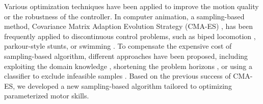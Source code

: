 Various optimization techniques have been applied to improve the
motion quality or the robustness of the controller. In computer
animation, a sampling-based method, Covariance Matrix Adaption
Evolution Strategy (CMA-ES) \cite{Hansen:2003:CMA}, has been
frequently applied to discontinuous control problems, such as biped
locomotion \cite{Wang:2010:OWC,Wang:2012:OLC},
parkour-style stunts\cite{Liu:2012:TRC,Ha:2014:ITD}, or swimming
\cite{Tan:2011:ASC}.  To compensate the expensive cost of
sampling-based algorithm, different approaches have been proposed,
including exploiting the domain knowledge
\cite{Wang:2010:OWC,Wang:2012:OLC}, shortening the
problem horizons \cite{Sok:2007:SBB}, or using a classifier to exclude
infeasible samples \cite{Ha:2014:ITD}. Based on the previous success
of CMA-ES, we developed a new sampling-based algorithm tailored to
optimizing parameterized motor skills.







